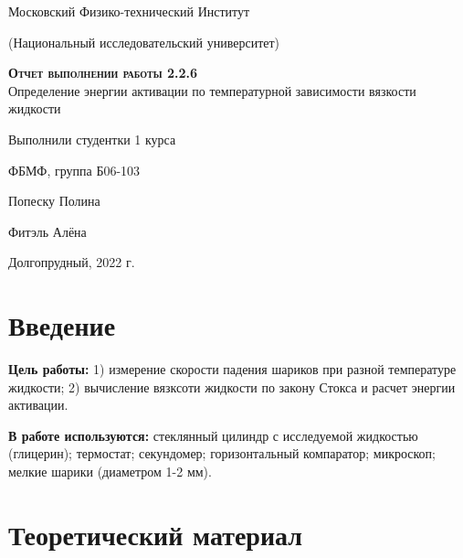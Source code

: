 \documentclass[12pt,a4paper]{article}
\begin{document}
\begin{titlepage}
  \begin{center}
    \huge
    Московский Физико-технический Институт
    
    (Национальный исследовательский университет)
    \vspace{0.5cm}

   
    \vspace{0.25cm}
 
    \vfill
 
    \vfill

    \textsc{\bf{Отчет выполнении работы 2.2.6}}\\[3mm]
    
    {\LARGE Определение энергии активации по температурной зависимости вязкости жидкости}
  \bigskip
    \vfill
    
\end{center}
\vfill
\begin{flushright}

    Выполнили студентки 1 курса
    
    ФБМФ, группа Б06-103

    Попеску Полина
    
    
    Фитэль Алёна

\end{flushright}
\bigskip


\vfill

\begin{center}
  Долгопрудный, 2022 г.
\end{center}
\end{titlepage}

\section{Введение}

\textbf{Цель работы:} 1) измерение скорости падения шариков при разной температуре жидкости; 2) вычисление вязксоти жидкости по закону Стокса и расчет энергии активации.
	
\textbf{В работе используются:} стеклянный цилиндр с исследуемой жидкостью (глицерин); термостат; секундомер; горизонтальный компаратор; микроскоп; мелкие шарики (диаметром 1-2 мм).
	


\section{Теоретический материал}
\end{document}
